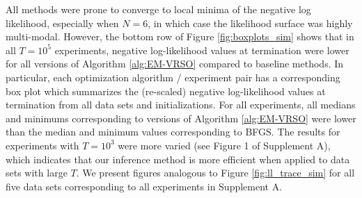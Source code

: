 %
All methods were prone to converge to local minima of the negative log likelihood, especially when $N=6$, in which case the likelihood surface was highly multi-modal. However, the bottom row of Figure \ref{fig:boxplots_sim} shows that in all $T=10^5$ experiments, negative log-likelihood values at termination were lower for all versions of Algorithm \ref{alg:EM-VRSO} compared to baseline methods. In particular, each optimization algorithm / experiment pair has a corresponding box plot which summarizes the (re-scaled) negative log-likelihood values at termination from all data sets and initializations. For all experiments, all medians and minimums corresponding to versions of Algorithm \ref{alg:EM-VRSO} were lower than the median and minimum values corresponding to BFGS. The results for experiments with $T=10^3$ were more varied (see Figure 1 of Supplement A), which indicates that our inference method is more efficient when applied to data sets with large $T$.
%
We present figures analogous to Figure \ref{fig:ll_trace_sim} for all five data sets corresponding to all experiments in Supplement A.